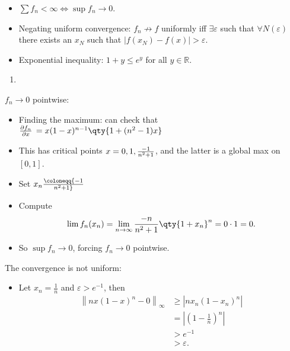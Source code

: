 \begin{solution}

\envlist

\begin{concept}

\envlist

\begin{itemize}
\tightlist
\item
  \(\sum f_n < \infty \iff \sup f_n \to 0\).
\item
  Negating uniform convergence: \(f_n\not\to f\) uniformly iff
  \(\exists \varepsilon\) such that \(\forall N(\varepsilon)\) there
  exists an \(x_N\) such that
  \({\left\lvert {f(x_N) - f(x)} \right\rvert} > \varepsilon\).
\item
  Exponential inequality: \(1+y \leq e^y\) for all
  \(y\in {\mathbb{R}}\).
\end{itemize}

\end{concept}

\begin{enumerate}
\def\labelenumi{\alph{enumi}.}
\tightlist
\item
\end{enumerate}

\(f_n\to 0\) pointwise:

\begin{itemize}
\tightlist
\item
  Finding the maximum: can check that
  \({\frac{\partial f_n}{\partial x}\,} = x(1-x)^{n-1} \qty{1 + (n^2-1)x}\)
\item
  This has critical points \(x=0, 1, {-1 \over n^2 + 1}\), and the
  latter is a global max on \([0, 1]\).
\item
  Set \(x_n \coloneqq{-1 \over n^2 + 1}\)
\item
  Compute
  \begin{align*}  
  \lim f_n(x_n) = \lim_{n\to \infty } {-n \over n^2 + 1} \qty{1 + x_n}^n = 0\cdot 1 = 0
  .\end{align*}
\item
  So \(\sup f_n \to 0\), forcing \(f_n \to 0\) pointwise.
\end{itemize}

The convergence is not uniform:

\begin{itemize}
\item
  Let \(x_n = \frac 1 n\) and \(\varepsilon > e^{-1}\), then
  \begin{align*}
  {\left\lVert {nx(1-x)^n - 0} \right\rVert}_\infty
  &\geq {\left\lvert {nx_n (1-x_n)^n} \right\rvert} \\
  &= {\left\lvert {\left( 1 - \frac 1 n\right)^n} \right\rvert} \\
  &> e^{-1} \\
  &> \varepsilon
  .\end{align*}


\end{itemize}
\end{solution}
